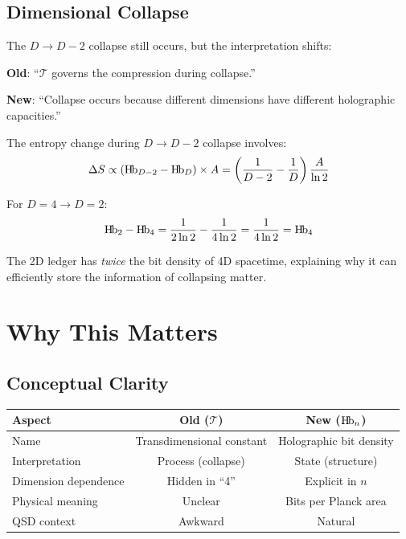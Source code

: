\documentclass[11pt,a4paper]{article}
\newcommand{\Hb}{\textnormal{H\kern-0.12em b}}
\newcommand{\Hbn}{\Hb_n}
\newcommand{\Hbfour}{\Hb_4}
\newcommand{\Tc}{\mathcal{T}}
\begin{document}
\subsection{Dimensional Collapse}

The $D \to D-2$ collapse still occurs, but the interpretation shifts:

\textbf{Old}: ``$\Tc$ governs the compression during collapse.''

\textbf{New}: ``Collapse occurs because different dimensions have different holographic capacities.''

The entropy change during $D \to D-2$ collapse involves:
\begin{equation}
\Delta S \propto \left(\Hb_{D-2} - \Hb_D\right) \times A = \left(\frac{1}{D-2} - \frac{1}{D}\right) \frac{A}{\ln 2}
\end{equation}

For $D=4 \to D=2$:
\begin{equation}
\Hb_2 - \Hbfour = \frac{1}{2\ln 2} - \frac{1}{4\ln 2} = \frac{1}{4\ln 2} = \Hbfour
\end{equation}

The 2D ledger has \emph{twice} the bit density of 4D spacetime, explaining why it can efficiently store the information of collapsing matter.

\section{Why This Matters}
\label{sec:significance}

\subsection{Conceptual Clarity}

\begin{center}
\begin{tabular}{lcc}
\toprule
\textbf{Aspect} & \textbf{Old ($\Tc$)} & \textbf{New ($\Hbn$)} \\
\midrule
Name & Transdimensional constant & Holographic bit density \\
Interpretation & Process (collapse) & State (structure) \\
Dimension dependence & Hidden in ``4'' & Explicit in $n$ \\
Physical meaning & Unclear & Bits per Planck area \\
QSD context & Awkward & Natural \\
\bottomrule
\end{tabular}
\end{center}
\end{document}
